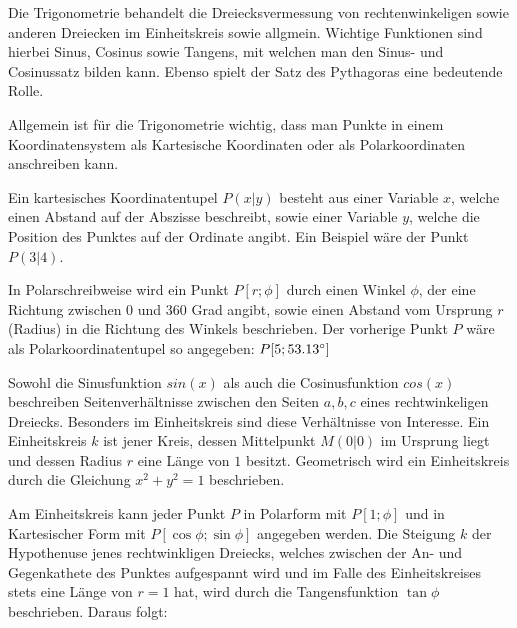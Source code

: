 



\thispagestyle{plain}



Die Trigonometrie behandelt die Dreiecksvermessung von rechtenwinkeligen sowie anderen Dreiecken im Einheitskreis sowie allgmein. Wichtige Funktionen sind hierbei Sinus, Cosinus sowie Tangens, mit welchen man den Sinus- und Cosinussatz bilden kann. Ebenso spielt der Satz des Pythagoras eine bedeutende Rolle.


Allgemein ist f\"{u}r die Trigonometrie wichtig, dass man Punkte in einem Koordinatensystem als Kartesische Koordinaten oder als Polarkoordinaten anschreiben kann. 

Ein kartesisches Koordinatentupel $P (x | y)$ besteht aus einer Variable $x$, welche einen Abstand auf der Abszisse beschreibt, sowie einer Variable $y$, welche die Position des Punktes auf der Ordinate angibt. Ein Beispiel w\"{a}re der Punkt $P(3 | 4)$.

In Polarschreibweise wird ein Punkt $P [r; \phi]$ durch einen Winkel $\phi$, der eine Richtung zwischen $0$ und $360$ Grad angibt, sowie einen Abstand vom Ursprung $r$ (Radius) in die Richtung des Winkels beschrieben. Der vorherige Punkt $P$ w\"{a}re als Polarkoordinatentupel so angegeben: $P [5; 53.13\degree]$


Sowohl die Sinusfunktion $sin(x)$ als auch die Cosinusfunktion $cos(x)$ beschreiben Seitenverh\"{a}ltnisse zwischen den Seiten $a, b, c$ eines rechtwinkeligen Dreiecks. Besonders im Einheitskreis sind diese Verh\"{a}ltnisse von Interesse. Ein Einheitskreis $k$ ist jener Kreis, dessen Mittelpunkt $M (0 | 0)$ im Ursprung liegt und dessen Radius $r$ eine L\"{a}nge von $1$ besitzt. Geometrisch wird ein Einheitskreis durch die Gleichung $x^2 + y^2 = 1$ beschrieben.

Am Einheitskreis kann jeder Punkt $P$ in Polarform mit $P [1;\phi]$ und in Kartesischer Form mit $P [\cos \phi; \sin \phi]$ angegeben werden. Die Steigung $k$ der Hypothenuse jenes rechtwinkligen Dreiecks, welches zwischen der An- und Gegenkathete des Punktes aufgespannt wird und im Falle des Einheitskreises stets eine L\"{a}nge von $r = 1$ hat, wird durch die Tangensfunktion $\tan \phi$ beschrieben. Daraus folgt:

